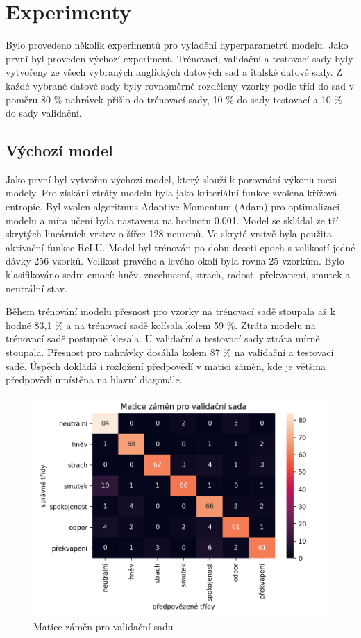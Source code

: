 \documentclass[FM,BP]{tulthesis}
\begin{document}
\chapter{Experimenty} %
Bylo provedeno několik experimentů pro vyladění hyperparametrů modelu. Jako první byl proveden výchozí experiment. Trénovací, validační a testovací sady byly vytvořeny ze všech vybraných anglických datových sad a italské datové sady. Z každé vybrané datové sady byly rovnoměrně rozděleny vzorky podle tříd do sad v poměru 80 \% nahrávek přišlo do trénovací sady, 10 \% do sady testovací a 10 \% do sady validační.

\section{Výchozí model}
Jako první byl vytvořen výchozí model, který slouží k porovnání výkonu mezi modely. Pro získání ztráty modelu byla jako kriteriální funkce zvolena křížová entropie. Byl zvolen algoritmus Adaptive Momentum (Adam) pro optimalizaci modelu a míra učení byla nastavena na hodnotu 0,001. Model se skládal ze tří skrytých lineárních vrstev o šířce 128 neuronů. Ve skryté vrstvě byla použita aktivační funkce ReLU. Model byl trénován po dobu deseti epoch s velikostí jedné dávky 256 vzorků. Velikost pravého a levého okolí byla rovna 25 vzorkům. Bylo klasifikováno sedm emocí: hněv, znechucení, strach, radost, překvapení, smutek a neutrální stav.

Během trénování modelu přesnost pro vzorky na trénovací sadě stoupala až k hodně 83,1 \% a na trénovací sadě kolísala kolem 59 \%. Ztráta modelu na trénovací sadě postupně klesala. U validační a testovací sady ztráta mírně stoupala. Přesnost pro nahrávky dosáhla kolem 87 \% na validační a testovací sadě. Úspěch dokládá i rozložení předpovědí v matici záměn, kde je většina předpovědí umístěna na hlavní diagonále.

\begin{figure}[!htbp]
\centerline{\includegraphics[scale=.5]{baseline-conf_matrix-val.png}}
\caption{Matice záměn pro validační sadu}
\label{fig}
\end{figure}
\FloatBarrier
\end{document}
